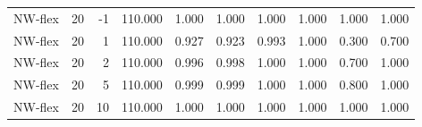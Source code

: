 \begin{table}
\begin{tabular}{lrrrrrrrrr}
NW-flex & 20 & -1 & 110.000 & 1.000 & 1.000 & 1.000 & 1.000 & 1.000 & 1.000 \\
NW-flex & 20 & 1 & 110.000 & 0.927 & 0.923 & 0.993 & 1.000 & 0.300 & 0.700 \\
NW-flex & 20 & 2 & 110.000 & 0.996 & 0.998 & 1.000 & 1.000 & 0.700 & 1.000 \\
NW-flex & 20 & 5 & 110.000 & 0.999 & 0.999 & 1.000 & 1.000 & 0.800 & 1.000 \\
NW-flex & 20 & 10 & 110.000 & 1.000 & 1.000 & 1.000 & 1.000 & 1.000 & 1.000 \\
\bottomrule
\end{tabular}
\end{table}
